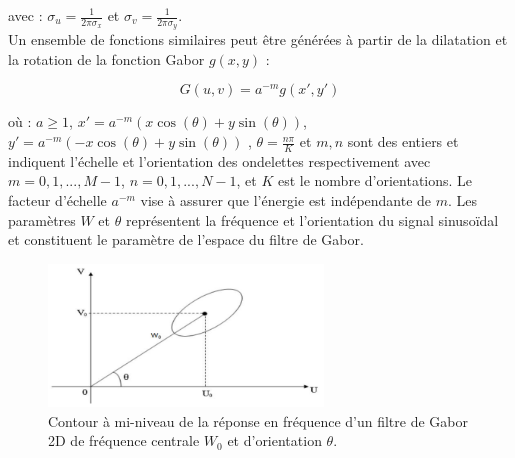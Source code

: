  avec : $\sigma_u = \frac{1}{2\pi \sigma_x } $ et  $ \sigma_v = \frac{1}{2\pi  \sigma_y} $. \\
 
 Un ensemble de fonctions similaires peut être générées à partir de la dilatation et la rotation de la fonction Gabor $g(x, y)$ :
 

\begin{equation}
 	G(u, v) = a^{-m} g(x', y')
\end{equation}


 où : $a \ge 1 $, $x' = a^{-m} ( x \cos(\theta) + y \sin(\theta) )$,  $y' = a^{-m} ( -x \cos(\theta) + y \sin(\theta) )$ , $\theta = \frac{n\pi}{K}$ et $m,n$ sont des entiers et indiquent l'échelle et l’orientation des ondelettes respectivement avec $m = 0,1,..., M-1 $,  $n=0,1,..., N-1$, et $K$ est le nombre d'orientations. Le facteur d’échelle $ a^{-m} $ vise à assurer que l'énergie est indépendante de $m$. Les paramètres $W$ et $\theta$ représentent la fréquence et l'orientation du signal sinusoïdal et constituent le paramètre de l'espace du filtre de Gabor.\\

\begin{figure}[H]
	\label{fig:gaborFig}
	\centering
	\includegraphics[width=0.65\textwidth]{Figures/gaborFig} %
	
	\caption{Contour à mi-niveau de la réponse en fréquence d’un filtre de Gabor 2D de fréquence centrale $W_0$ et d’orientation $\theta$.}
\end{figure}

